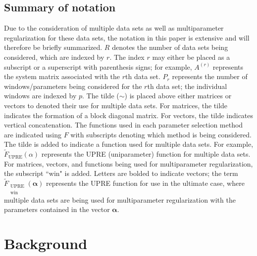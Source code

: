 \documentclass[12pt]{article}
\newcommand{\regparam}{\alpha}  %
\newcommand{\regparamVec}{\bm{\regparam}}   %
\newcommand{\UBig}{\widetilde{F}_{\text{UPRE}}}	%
\newcommand{\UWinBig}{\widetilde{F}_{\substack{\text{UPRE} \\ \text{win}}}}	%
\begin{document}
\subsection{Summary of notation} \label{sec:Notation}
Due to the consideration of multiple data sets as well as multiparameter regularization for these data sets, the notation in this paper is extensive and will therefore be briefly summarized. $R$ denotes the number of data sets being considered, which are indexed by $r$. The index $r$ may either be placed as a subscript or a superscript with parenthesis signs; for example, $A^{(r)}$ represents the system matrix associated with the $r$th data set. $P_r$ represents the number of windows/parameters being considered for the $r$th data set; the individual windows are indexed by $p$. The tilde ($\sim$) is placed above either matrices or vectors to denoted their use for multiple data sets. For matrices, the tilde indicates the formation of a block diagonal matrix. For vectors, the tilde indicates vertical concatenation. The functions used in each parameter selection method are indicated using $F$ with subscripts denoting which method is being considered. The tilde is added to indicate a function used for multiple data sets. For example, $\UBig(\regparam)$ represents the UPRE (uniparameter) function for multiple data sets. For matrices, vectors, and functions being used for multiparameter regularization, the subscript ``win" is added. Letters are bolded to indicate vectors; the term $\UWinBig(\regparamVec)$ represents the UPRE function for use in the ultimate case, where multiple data sets are being used for multiparameter regularization with the parameters contained in the vector $\regparamVec$.

\section{Background} \label{sec:Background}
\end{document}
